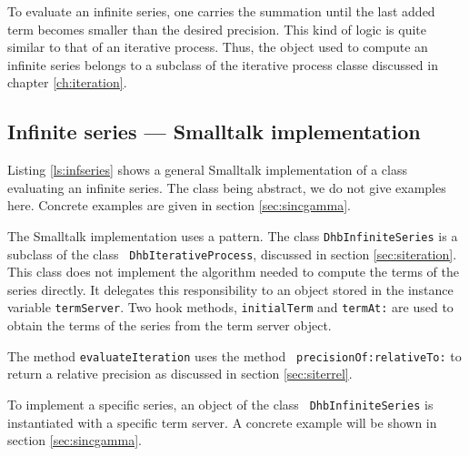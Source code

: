 \documentclass[twoside]{book}
\begin{document}
To evaluate an infinite series, one carries the summation until
the last added term becomes smaller than the desired precision.
This kind of logic is quite similar to that of an iterative
process. Thus, the object used to compute an infinite series
belongs to a subclass of the iterative process classe discussed in
chapter \ref{ch:iteration}.

\subsection{Infinite series --- Smalltalk  implementation}
\label{sec:sseries}
Listing \ref{ls:infseries} shows a general Smalltalk
implementation of a class evaluating an infinite series. The class
being abstract, we do not give examples here. Concrete examples
are given in section \ref{sec:sincgamma}.

The Smalltalk implementation uses a  pattern.
The class {\tt DhbInfiniteSeries} is a subclass of the class {\tt
DhbIterativeProcess}, discussed in section \ref{sec:siteration}.
This class does not implement the algorithm needed to compute the
terms of the series directly. It delegates this responsibility to
an object stored in the instance variable {\tt termServer}. Two
hook methods, {\tt initialTerm} and {\tt termAt:} are used to
obtain the terms of the series from the term server object.

The method {\tt evaluateIteration} uses the method {\tt
precisionOf:relativeTo:} to return a relative precision as
discussed in section \ref{sec:siterrel}.

To implement a specific series, an object of the class {\tt
DhbInfiniteSeries} is instantiated with a specific term server. A
concrete example will be shown in section \ref{sec:sincgamma}.
\end{document}
